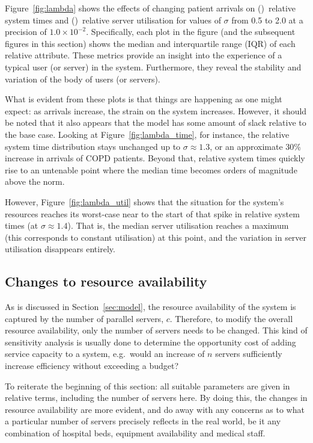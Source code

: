 Figure~\ref{fig:lambda} shows the effects of changing patient arrivals on
()~relative system times and
()~relative server utilisation for values of \(\sigma\)
from 0.5 to 2.0 at a precision of \(1.0 \times 10^{-2}\). Specifically, each
plot in the figure (and the subsequent figures in this section) shows the median
and interquartile range (IQR) of each relative attribute. These metrics provide
an insight into the experience of a typical user (or server) in the system.
Furthermore, they reveal the stability and variation of the body of users
(or servers).

What is evident from these plots is that things are happening as one might
expect: as arrivals increase, the strain on the system increases. However, it
should be noted that it also appears that the model has some amount of slack
relative to the base case. Looking at Figure~\ref{fig:lambda_time}, for
instance, the relative system time distribution stays unchanged up to \(\sigma
\approx 1.3\), or an approximate 30\% increase in arrivals of COPD patients.
Beyond that, relative system times quickly rise to an untenable point where the
median time becomes orders of magnitude above the norm.

However, Figure~\ref{fig:lambda_util} shows that the situation for the system's
resources reaches its worst-case near to the start of that spike in relative
system times (at \(\sigma \approx 1.4\)). That is, the median server utilisation
reaches a maximum (this corresponds to constant utilisation) at this point, and
the variation in server utilisation disappears entirely.


\subsection{Changes to resource availability}\label{subsec:resources}

As is discussed in Section~\ref{sec:model}, the resource availability of the
system is captured by the number of parallel servers, \(c\). Therefore, to
modify the overall resource availability, only the number of servers needs to be
changed. This kind of sensitivity analysis is usually done to determine the
opportunity cost of adding service capacity to a system, e.g.\ would an increase
of \(n\) servers sufficiently increase efficiency without exceeding a budget?

To reiterate the beginning of this section: all suitable parameters are given in
relative terms, including the number of servers here. By doing this, the
changes in resource availability are more evident, and do away with any
concerns as to what a particular number of servers precisely reflects in the
real world, be it any combination of hospital beds, equipment availability and
medical staff.

